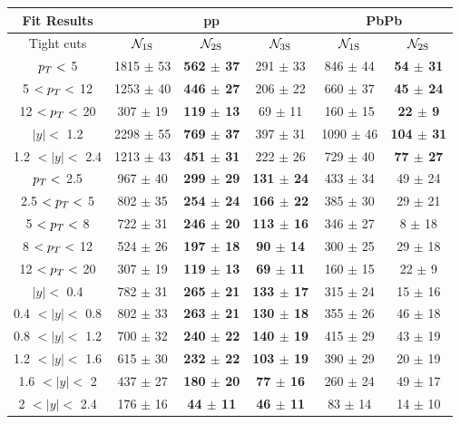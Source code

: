 \begin{table}[hbtp]
  \begin{centering}
    \begin{tabular}{c|c|c|c|c|c}
      \hline
      Fit Results &  \multicolumn{3}{c}{pp} \vline& \multicolumn{2}{c}{PbPb}  \\                                               
      \hline
      Tight cuts & ${\cal N}_{\rm 1S}$ & ${\cal N}_{\rm 2S}$ & ${\cal N}_{\rm 3S}$  &  ${\cal N}_{\rm 1S}$ &  ${\cal N}_{\rm 2S}$ \\  
      \hline 
      $p_{T} <$ 5 & 1815 $\pm$ 53 &  \textbf{562 $\pm$ 37} &  291 $\pm$ 33 & 846 $\pm$ 44 & \textbf{54 $\pm$ 31} \\  
      5 $< p_{T} <$ 12 & 1253 $\pm$ 40 & \textbf{ 446 $\pm$ 27} &  206 $\pm$ 22 & 660 $\pm$ 37 & \textbf{45 $\pm$ 24}  \\  
      12 $< p_{T} <$ 20 & 307 $\pm$ 19 &  \textbf{119 $\pm$ 13} &  69 $\pm$ 11 & 160 $\pm$ 15 & \textbf{22 $\pm$ 9}  \\  
      \hline
      $|y| <$ 1.2 & 2298 $\pm$ 55 & \textbf{ 769 $\pm$ 37} &  397 $\pm$ 31 & 1090 $\pm$ 46 & \textbf{104 $\pm$ 31} \\  
      1.2 $< |y| <$ 2.4 & 1213 $\pm$ 43 &  \textbf{451 $\pm$ 31} &  222 $\pm$ 26 & 729 $\pm$ 40 & \textbf{77 $\pm$ 27}  \\  


      \hline
      $p_{T} <$ 2.5 & 967 $\pm$ 40 &  \textbf{299 $\pm$ 29} &  \textbf{131 $\pm$ 24} & 433 $\pm$ 34 & 49 $\pm$ 24 \\  
      2.5 $< p_{T} <$ 5 & 802 $\pm$ 35 &  \textbf{254 $\pm$ 24} & \textbf{ 166 $\pm$ 22} & 385 $\pm$ 30 & 29 $\pm$ 21  \\  
      5 $< p_{T} <$ 8 & 722 $\pm$ 31 &  \textbf{246 $\pm$ 20} & \textbf{ 113 $\pm$ 16} & 346 $\pm$ 27 & 8 $\pm$ 18  \\  
      8 $< p_{T} <$ 12 & 524 $\pm$ 26 & \textbf{ 197 $\pm$ 18} & \textbf{ 90 $\pm$ 14} & 300 $\pm$ 25 & 29 $\pm$ 18  \\  
      12 $< p_{T} <$ 20 & 307 $\pm$ 19 & \textbf{ 119 $\pm$ 13} &  \textbf{69 $\pm$ 11} & 160 $\pm$ 15 & 22 $\pm$ 9  \\  
      \hline
      $|y| <$ 0.4 & 782 $\pm$ 31 &  \textbf{265 $\pm$ 21} &  \textbf{133 $\pm$ 17} & 315 $\pm$ 24 & 15 $\pm$ 16 \\  
      0.4 $< |y| <$ 0.8 & 802 $\pm$ 33 & \textbf{ 263 $\pm$ 21} & \textbf{ 130 $\pm$ 18} & 355 $\pm$ 26 & 46 $\pm$ 18  \\  
      0.8 $< |y| <$ 1.2 & 700 $\pm$ 32 & \textbf{ 240 $\pm$ 22} & \textbf{ 140 $\pm$ 19} & 415 $\pm$ 29 & 43 $\pm$ 19  \\  
      1.2 $< |y| <$ 1.6 & 615 $\pm$ 30 & \textbf{ 232 $\pm$ 22} & \textbf{ 103 $\pm$ 19} & 390 $\pm$ 29 & 20 $\pm$ 19  \\  
      1.6 $< |y| <$ 2 & 437 $\pm$ 27 &  \textbf{180 $\pm$ 20} & \textbf{ 77 $\pm$ 16} & 260 $\pm$ 24 & 49 $\pm$ 17  \\  
      2 $< |y| <$ 2.4 & 176 $\pm$ 16 & \textbf{ 44 $\pm$ 11} & \textbf{ 46 $\pm$ 11} & 83 $\pm$ 14 & 14 $\pm$ 10  \\  


\end{tabular}
\end{centering}
\end{table}

